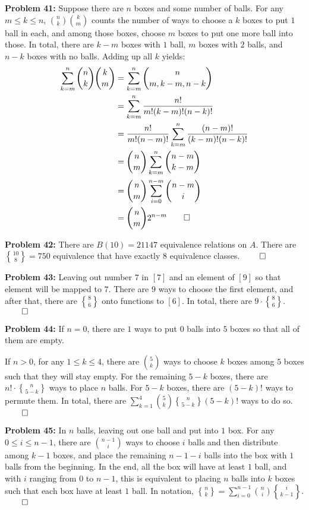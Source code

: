 \documentclass[12pt]{article}
\newcommand{\prob}[1]{\textbf{Problem #1:}}
\begin{document}
\prob{41} Suppose there are $n$ boxes and some number of balls. For any $m \le k \le n$, $\binom{n}{k} \binom{k}{m}$ counts the number of ways to choose a $k$ boxes to put $1$ ball in each, and among those boxes, choose $m$ boxes to put one more ball into those. In total, there are $k-m$ boxes with $1$ ball, $m$ boxes with $2$ balls, and $n-k$ boxes with no balls. Adding up all $k$ yields:
\begin{align*}
    \sum\limits^n_{k=m} \binom{n}{k} \binom{k}{m} &= \sum\limits^n_{k=m} \binom{n}{m, k-m, n-k}\\
     &= \sum\limits^n_{k=m} \frac{n!}{m!(k-m)!(n-k)!} \\
     &= \frac{n!}{m!(n-m)!}\sum\limits^n_{k=m} \frac{(n-m)!}{(k-m)!(n-k)!} \\
     &= \binom{n}{m} \sum\limits^n_{k=m} \binom{n-m}{k-m} \\
     &= \binom{n}{m} \sum\limits^{n-m}_{i=0} \binom{n-m}{i} \\
     &= \binom{n}{m} 2^{n-m} \qed \\
\end{align*}

\prob{42} There are $B(10) = 21147$ equivalence relations on $A$. There are ${10 \brace 8} = 750$ equivalence that have exactly $8$ equivalence classes. $\qed$

\prob{43} Leaving out number $7$ in $[7]$ and an element of $[9]$ so that element will be mapped to $7$. There are $9$ ways to choose the first element, and after that, there are ${8 \brace 6}$ onto functions to $[6]$. In total, there are $9 \cdot {8 \brace 6}$. $\qed$

\prob{44} If $n = 0$, there are $1$ ways to put $0$ balls into $5$ boxes so that all of them are empty. 

If $n > 0$, for any $ 1 \le k \le 4$, there are $\binom{5}{k}$ ways to choose $k$ boxes among $5$ boxes such that they will stay empty. For the remaining $5-k$ boxes, there are $n!\cdot {n \brace 5-k}$ ways to place $n$ balls. For $5-k$ boxes, there are $(5-k)!$ ways to permute them. In total, there are $\sum\limits^4_{k=1} \binom{5}{k} {n \brace 5-k} (5-k)!$ ways to do so. $\qed$

\prob{45} In $n$ balls, leaving out one ball and put into $1$ box. For any $0 \le i \le n-1$, there are $\binom{n-1}{i}$ ways to choose $i$ balls and then distribute among $k-1$ boxes, and place the remaining $n-1-i$ balls into the box with $1$ balls from the beginning. In the end, all the box will have at least $1$ ball, and with $i$ ranging from $0$ to $n-1$, this is equivalent to placing $n$ balls into $k$ boxes such that each box have at least $1$ ball. In notation, ${ n \brace k} = \sum\limits^{n-1}_{i=0} \binom{n}{i} {i \brace k-1}$. $\qed$
\end{document}

